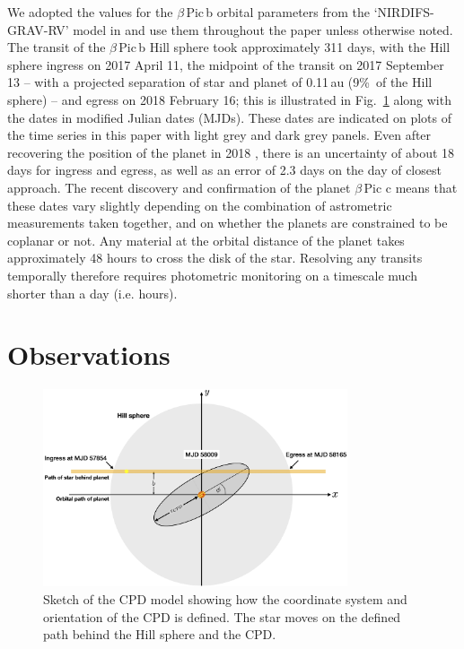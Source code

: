 \documentclass[longauth]{aa} %
\newcommand{\bpb}{$\beta$\,Pic\,b}
\newcommand{\bp}{$\beta$\,Pic}
\begin{document}
We adopted the values for the \bpb{} orbital parameters from the `NIRDIFS-GRAV-RV' model in \citet{Lagrange20} and use them throughout the paper unless otherwise noted.
%
The transit of the \bpb{} Hill sphere took approximately 311 days, with the Hill sphere ingress on 2017 April 11, the midpoint of the transit on 2017 September 13 -- with a projected separation of star and planet of 0.11\,au (9\%\, of the Hill sphere) -- and egress on 2018 February 16; this is illustrated in Fig.~\ref{cpdmodel} along with the dates in modified Julian dates (MJDs).
%
These dates are indicated on plots of the time series in this paper with light grey and dark grey panels.
%
Even after recovering the position of the planet in 2018 \citep{Lagrange19}, there is an uncertainty of about 18 days for ingress and egress, as well as an error of 2.3 days on the day of closest approach.
%
The recent discovery and confirmation of the planet \bp{} c \citep{Lagrange20,Nowak20} means that these dates vary slightly depending on the combination of astrometric measurements taken together, and on whether the planets are constrained to be coplanar or not.
%
Any material at the orbital distance of the planet takes approximately 48 hours to cross the disk of the star.
%
Resolving any transits temporally therefore requires photometric monitoring on a timescale much shorter than a day (i.e. hours).

\section{Observations}\label{sec:obs}

\begin{figure}[htb]
\centering
\includegraphics[width=0.8\textwidth]{disk_sketch.jpg}
\caption{Sketch of the CPD model showing how the coordinate system and orientation of the CPD is defined. The star moves on the defined path behind the Hill sphere and the CPD.}
\label{cpdmodel}
\end{figure}
\end{document}
